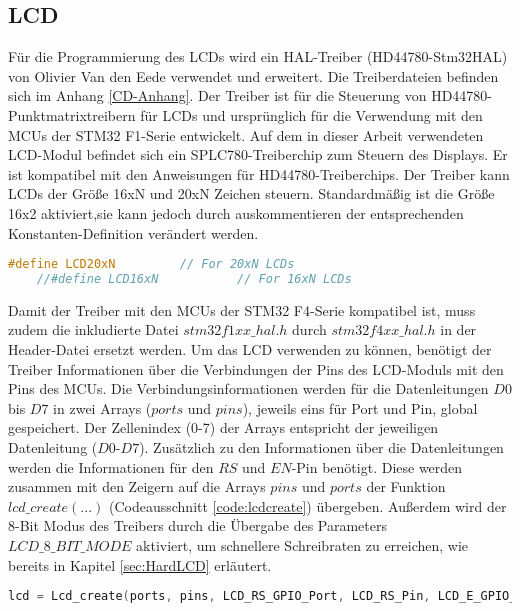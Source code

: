 \subsection{LCD}
Für die Programmierung des LCDs wird ein HAL-Treiber (HD44780-Stm32HAL) von Olivier Van den Eede verwendet und erweitert. Die Treiberdateien befinden sich im Anhang \ref{CD-Anhang}. Der Treiber ist für die Steuerung von HD44780-Punktmatrixtreibern für LCDs und ursprünglich für die Verwendung mit den MCUs der STM32 F1-Serie entwickelt. Auf dem in dieser Arbeit verwendeten LCD-Modul befindet sich ein SPLC780-Treiberchip zum Steuern des Displays. Er ist kompatibel mit den Anweisungen für HD44780-Treiberchips. Der Treiber kann LCDs der Größe 16xN und 20xN Zeichen steuern. Standardmäßig ist die Größe 16x2 aktiviert,sie kann jedoch durch auskommentieren der entsprechenden Konstanten-Definition verändert werden. 
\begin{lstlisting}[firstnumber=16, language=C, caption = lcd.h: Einstellung Displaygröße, label = code:lcdsize]
	#define LCD20xN 		// For 20xN LCDs
	//#define LCD16xN			// For 16xN LCDs
\end{lstlisting}
Damit der Treiber mit den MCUs der STM32 F4-Serie kompatibel ist, muss zudem die inkludierte Datei $stm32f1xx\_hal.h$ durch $stm32f4xx\_hal.h$ in der Header-Datei ersetzt werden.
\newline
Um das LCD verwenden zu können, benötigt der Treiber Informationen über die Verbindungen der Pins des LCD-Moduls mit den Pins des MCUs. Die Verbindungsinformationen werden für die Datenleitungen $D0$ bis $D7$ in zwei Arrays ($ports$ und $pins$), jeweils eins für Port und Pin, global gespeichert. Der Zellenindex (0-7) der Arrays entspricht der jeweiligen Datenleitung ($D0$-$D7$). Zusätzlich zu den Informationen über die Datenleitungen werden die Informationen für den $RS$ und $EN$-Pin benötigt. Diese werden zusammen mit den Zeigern auf die Arrays $pins$ und $ports$ der Funktion $lcd\_create(...)$ (Codeausschnitt \ref{code:lcdcreate}) übergeben. Außerdem wird der 8-Bit Modus des Treibers durch die Übergabe des Parameters $LCD\_8\_BIT\_MODE$ aktiviert, um schnellere Schreibraten zu erreichen, wie bereits in Kapitel \ref{sec:HardLCD} erläutert.
\begin{lstlisting}[firstnumber=302, language=C, caption = main.c: Funktionsaufruf lcd\_create(...), label = code:lcdcreate, breaklines = true]
lcd = Lcd_create(ports, pins, LCD_RS_GPIO_Port, LCD_RS_Pin, LCD_E_GPIO_Port, LCD_E_Pin, LCD_8_BIT_MODE);
\end{lstlisting}
